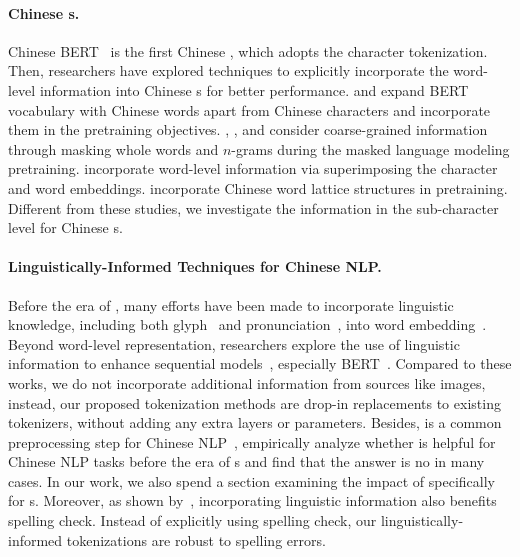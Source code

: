 \paragraph{Chinese \plm{}s.} Chinese BERT~\cite{BERT} is the first Chinese \plm, which adopts the character tokenization. Then, researchers have explored techniques to explicitly incorporate the word-level information into Chinese \plm{}s for better performance. \citet{MVP-BERT} and \citet{AMBERT} expand BERT vocabulary with Chinese words apart from Chinese characters and incorporate them in the pretraining objectives. \citet{WWM}, \citet{NEZHA}, and \citet{ERNIE-GRAM} consider coarse-grained information through masking whole words and $n$-grams during the masked language modeling pretraining. \citet{ZEN} incorporate word-level information via superimposing the character and word embeddings. \citet{Lattice-BERT} incorporate Chinese word lattice structures in pretraining. Different from these studies, we investigate the information in the sub-character level for Chinese \plm{}s.
  
\paragraph{Linguistically-Informed Techniques for Chinese NLP.} 
Before the era of \plm{}, many efforts have been made to incorporate linguistic knowledge, including both glyph~\cite{sun2014radical,yu2017joint,cw2vec} and pronunciation~\cite{zhang2019learning,chaudhary-etal-2018-adapting}, into word embedding~\cite{mikolov2013distributed}.
Beyond word-level representation, researchers explore the use of linguistic information to enhance sequential models~\cite{dong2016character,bharadwaj-etal-2016-phonologically,liu-etal-2017-learning}, especially BERT~\cite{glyce,sun-etal-2021-chinesebert}.
Compared to these works, we do not incorporate additional information from sources like images, instead, our proposed tokenization methods are drop-in replacements to existing tokenizers, without adding any extra layers or parameters. 
Besides, \cws{} is a common preprocessing step for Chinese NLP~\cite{THULAC}, 
\citet{CWSnecessary} empirically analyze whether \cws{} is helpful for Chinese NLP tasks before the era of \plm{}s and find that the answer is no in many cases. 
In our work, we also spend a section examining the impact of \cws{} specifically for \plm{}s. 
Moreover, as shown by~\citet{huang-etal-2021-phmospell}, incorporating linguistic information also benefits spelling check.
Instead of explicitly using spelling check, our linguistically-informed tokenizations are robust to spelling errors.

